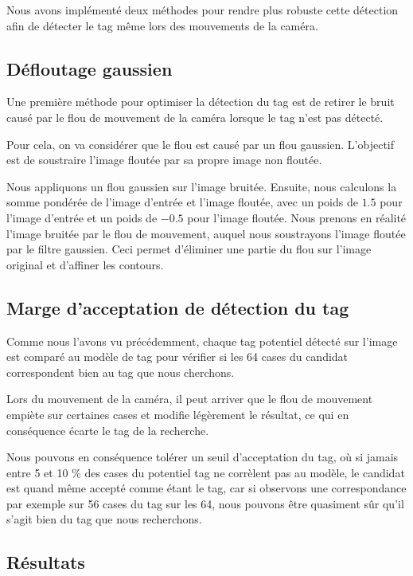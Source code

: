    Nous avons implémenté deux méthodes pour rendre plus robuste cette détection afin de détecter le tag même lors des mouvements de la caméra.

        \subsection{Défloutage gaussien}

        Une première méthode pour optimiser la détection du tag est de retirer le bruit causé par le flou de mouvement de la caméra lorsque le tag n'est pas détecté.

        Pour cela, on va considérer que le flou est causé par un flou gaussien. L'objectif est de soustraire l'image floutée par sa propre image non floutée.

        Nous appliquons un flou gaussien sur l'image bruitée. Ensuite, nous calculons la somme pondérée de l'image d'entrée et l'image floutée, avec un poids de $1.5$ pour l'image d'entrée et un poids de $-0.5$ pour l'image floutée. Nous prenons en réalité l'image bruitée par le flou de mouvement, auquel nous soustrayons l'image floutée par le filtre gaussien. Ceci permet d'éliminer une partie du flou sur l'image original et d'affiner les contours.

        \subsection{Marge d'acceptation de détection du tag}

        Comme nous l'avons vu précédemment, chaque tag potentiel détecté sur l'image est comparé au modèle de tag pour vérifier si les 64 cases du candidat correspondent bien au tag que nous cherchons.

        Lors du mouvement de la caméra, il peut arriver que le flou de mouvement empiète sur certaines cases et modifie légèrement le résultat, ce qui en conséquence écarte le tag de la recherche.

        Nous pouvons en conséquence tolérer un seuil d'acceptation du tag, où si jamais entre 5 et 10 \% des cases du potentiel tag ne corrèlent pas au modèle, le candidat est quand même accepté comme étant le tag, car si observons une correspondance par exemple sur 56 cases du tag sur les 64, nous pouvons être quasiment sûr qu'il s'agit bien du tag que nous recherchons.

        \subsection{Résultats}


